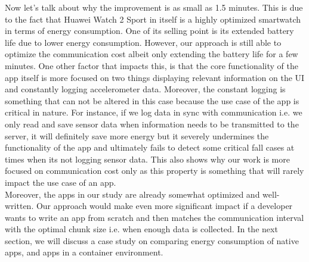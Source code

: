 Now let's talk about why the improvement is as small as 1.5 minutes. This is due to the fact that Huawei Watch 2 Sport in itself is a highly optimized smartwatch in terms of energy consumption. 
One of its selling point is its extended battery life due to lower energy consumption. However, our approach is still able to optimize the 
communication cost albeit only extending the battery life for a few minutes. One other factor that impacts this, is that the core functionality 
of the app itself is more focused on two things \textemdash displaying relevant information on the UI and constantly logging accelerometer data. 
Moreover, the constant logging is something that can not be altered in this case because the use case of the app is critical in nature. For 
instance, if we log data in sync with communication i.e. we only read and save sensor data 
when information needs to be transmitted to the server, it will definitely save more energy but it severely undermines the functionality of the app and 
ultimately fails to detect some critical fall cases at times when its not logging sensor data. This also shows why our work is more focused on 
communication cost only as this property is something that will rarely impact the use case of an app. \\
Moreover, the apps in our study are already somewhat optimized and well-written. Our approach would make even more significant impact if 
a developer wants to write an app from scratch and then matches the communication interval with the optimal chunk size i.e. when enough data is 
collected. In the next section, we will discuss a case study on comparing energy consumption of native apps, and apps in a container environment. 

